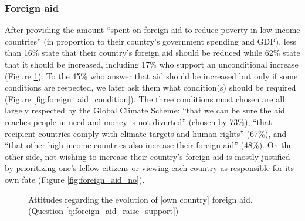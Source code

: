 \subsubsection{Foreign aid} %
After providing the amount %
``spent on foreign aid to reduce poverty in low-income countries'' (in proportion to their country's government spending and GDP), less than 16\% state that their country's foreign aid should be reduced while 62\% state that it should be increased, including 17\% who support an unconditional increase (Figure \ref{fig:foreign_aid_raise_support}). To the 45\% who answer that aid should be increased but only if some conditions are respected, we later ask them what condition(s) should be required (Figure \ref{fig:foreign_aid_condition}). The three conditions most chosen are all largely respected by the Global Climate Scheme: ``that we can be sure the aid reaches people in need and money is not diverted'' (chosen by 73\%), ``that recipient countries comply with climate targets and human rights'' (67\%), and ``that other high-income countries also increase their foreign aid'' (48\%). %
On the other side, not wishing to increase their country's foreign aid is mostly justified by prioritizing one's fellow citizens or viewing each country as responsible for its own fate (Figure \ref{fig:foreign_aid_no}). 

\begin{figure}[h!]
  \caption[Attitudes on the evolution of foreign aid]{Attitudes regarding the evolution of [own country] foreign aid. (Question \ref{q:foreign_aid_raise_support})}\label{fig:foreign_aid_raise_support}
\end{figure}

